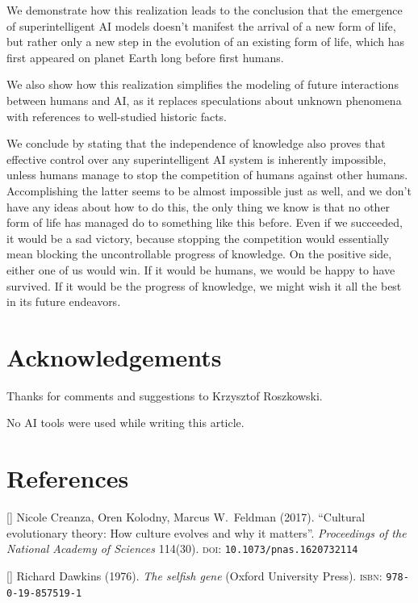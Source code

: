 \documentclass[12pt]{article}
\newcommand{\citestrut}[1]{\vphantom{[}{#1}\vphantom{]}}
\newcommand{\custombibitem}[3]{\hypertarget{#1}{[\href{#2}{\citestrut{#1}}] {#3}}}
\begin{document}
We demonstrate how this realization leads to the conclusion that the emergence of
superintelligent AI models doesn't manifest the arrival of a new form of life, but rather
only a new step in the evolution of an existing form of life, which has first appeared on
planet Earth long before first humans.

We also show how this realization simplifies the modeling of future interactions between
humans and AI, as it replaces speculations about unknown phenomena with references to
well-studied historic facts.

We conclude by stating that the independence of knowledge also proves that effective
control over any superintelligent AI system is inherently impossible, unless humans
manage to stop the competition of humans against other humans. Accomplishing the latter
seems to be almost impossible just as well, and we don't have any ideas about how to do
this, the only thing we know is that no other form of life has managed do to something
like this before. Even if we succeeded, it would be a sad victory, because stopping the
competition would essentially mean blocking the uncontrollable progress of knowledge. On
the positive side, either one of us would win. If it would be humans, we would be happy
to have survived. If it would be the progress of knowledge, we might wish it all the best
in its future endeavors.

\section*{Acknowledgements}

Thanks for comments and suggestions to Krzysztof Roszkowski.

No AI tools were used while writing this article.

\section*{References}

\custombibitem{Culture}{https://www.pnas.org/doi/abs/10.1073/pnas.1620732114}
{Nicole Creanza, Oren Kolodny, Marcus W.\ Feldman (2017).
``Cultural evolutionary theory: How culture evolves and why it matters''.
\textit{Proceedings of the National Academy of Sciences} 114(30).
\textsc{doi}: {\tt 10.1073/pnas.1620732114}}

\custombibitem{SelfishGene}{https://en.wikipedia.org/wiki/The_Selfish_Gene}
{Richard Dawkins (1976).
\textit{The selfish gene} (Oxford University Press).
\textsc{isbn}: {\tt 978-0-19-857519-1}}
\end{document}
